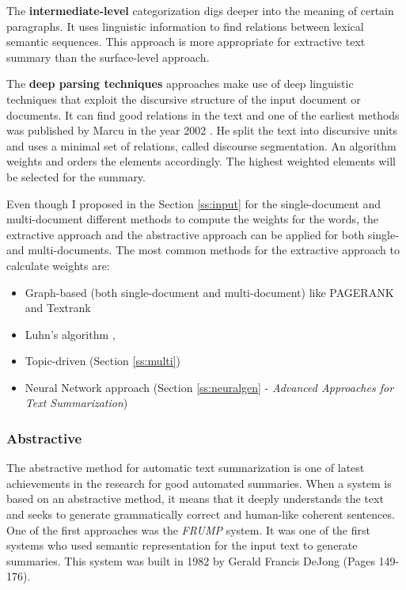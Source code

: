 The \textbf{intermediate-level} categorization digs deeper into the meaning of certain paragraphs. It uses linguistic information to find relations between lexical semantic sequences. This approach is more appropriate for extractive text summary than the surface-level approach.

The \textbf{deep parsing techniques} approaches make use of deep linguistic techniques that exploit the discursive structure of the input document or documents. It can find good relations in the text and one of the earliest methods was published by Marcu in the year 2002 \cite{marcu}. He split the text into discursive units and uses a minimal set of relations, called discourse segmentation. An algorithm weights and orders the elements accordingly. The highest weighted elements will be selected for the summary.

Even though I proposed in the Section \ref{ss:input} for the single-document and multi-document different methods to compute the weights for the words, the extractive approach and the abstractive approach can be applied for both single- and multi-documents. The most common methods for the extractive approach to calculate weights are:

\begin{itemize}
	\item Graph-based (both single-document and multi-document) like PAGERANK and Textrank
	\item Luhn's algorithm \cite{textmining1958}, 
	\item Topic-driven (Section \ref{ss:multi}) 
	\item Neural Network approach (Section \ref{ss:neuralgen} - \textit{Advanced Approaches for Text Summarization})
\end{itemize}

\subsubsection{Abstractive}\label{ss:abstractive}

The abstractive method for automatic text summarization is one of latest achievements in the research for good automated summaries. When a system is based on an abstractive method, it means that it deeply understands the text and seeks to generate grammatically correct and human-like coherent sentences. One of the first approaches was the \textit{FRUMP} system. It was one of the first systems who used semantic representation for the input text to generate summaries. This system was built in 1982 by Gerald Francis DeJong \cite{Dej82} (Pages 149-176).


